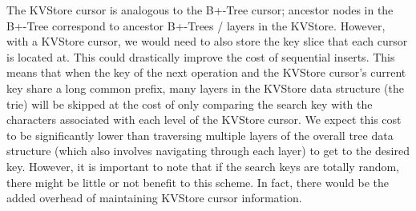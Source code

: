 The KVStore cursor is analogous to the B+-Tree cursor; ancestor nodes in the B+-Tree correspond to ancestor B+-Trees / layers in the KVStore. However, with a KVStore cursor, we would need to also store the key slice that each cursor is located at. This could drastically improve the cost of sequential inserts. This means that when the key of the next operation and the KVStore cursor's current key share a long common prefix, many layers in the KVStore data structure (the trie) will be skipped at the cost of only comparing the search key with the characters associated with each level of the KVStore cursor. We expect this cost to be significantly lower than traversing multiple layers of the overall tree data structure (which also involves navigating through each layer) to get to the desired key. However, it is important to note that if the search keys are totally random, there might be little or not benefit to this scheme. In fact, there would be the added overhead of maintaining KVStore cursor information. 

